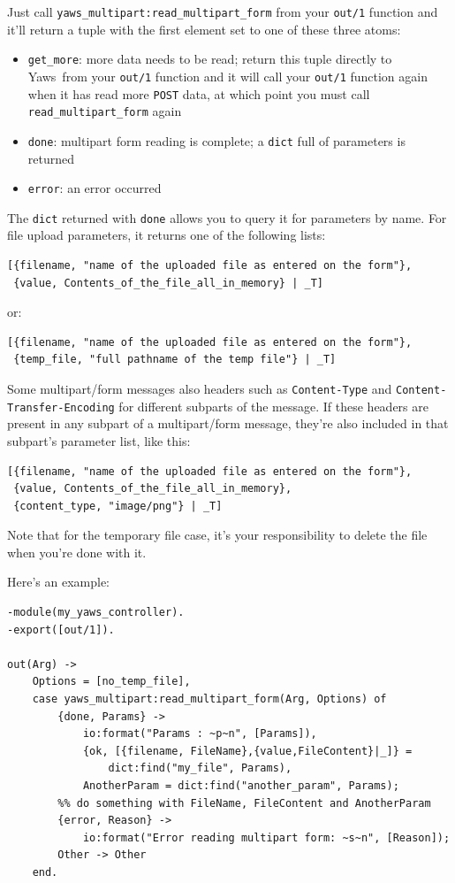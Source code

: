 \documentclass[11pt,oneside,english]{book}
\newcommand{\Yaws}            %
        {{\sc Yaws}}
\begin{document}
Just call \verb+yaws_multipart:read_multipart_form+ from your
\verb+out/1+ function and it'll return a tuple with the first element
set to one of these three atoms:

\begin{itemize}
\item \verb+get_more+: more data needs to be read; return this tuple
  directly to \Yaws\ from your \verb+out/1+ function and it will call
  your \verb+out/1+ function again when it has read more \verb+POST+
  data, at which point you must call \verb+read_multipart_form+ again
\item \verb+done+: multipart form reading is complete; a
  \verb+dict+ full of parameters is returned
\item \verb+error+: an error occurred
\end{itemize}

The \verb+dict+ returned with \verb+done+ allows you to query it for
parameters by name. For file upload parameters, it returns one of the
following lists:

\begin{verbatim}
[{filename, "name of the uploaded file as entered on the form"},
 {value, Contents_of_the_file_all_in_memory} | _T]
\end{verbatim}

or:

\begin{verbatim}
[{filename, "name of the uploaded file as entered on the form"},
 {temp_file, "full pathname of the temp file"} | _T]
\end{verbatim}

Some multipart/form messages also headers such as \verb+Content-Type+
and \verb+Content-Transfer-Encoding+ for different subparts of the
message. If these headers are present in any subpart of a
multipart/form message, they're also included in that subpart's
parameter list, like this:

\begin{verbatim}
[{filename, "name of the uploaded file as entered on the form"},
 {value, Contents_of_the_file_all_in_memory},
 {content_type, "image/png"} | _T]
\end{verbatim}

Note that for the temporary file case, it's your responsibility to
delete the file when you're done with it.

Here's an example:

\begin{verbatim}
-module(my_yaws_controller).
-export([out/1]).

out(Arg) ->
    Options = [no_temp_file],
    case yaws_multipart:read_multipart_form(Arg, Options) of
        {done, Params} ->
            io:format("Params : ~p~n", [Params]),
            {ok, [{filename, FileName},{value,FileContent}|_]} =
                dict:find("my_file", Params),
            AnotherParam = dict:find("another_param", Params);
        %% do something with FileName, FileContent and AnotherParam
        {error, Reason} ->
            io:format("Error reading multipart form: ~s~n", [Reason]);
        Other -> Other
    end.
\end{verbatim}
\end{document}
